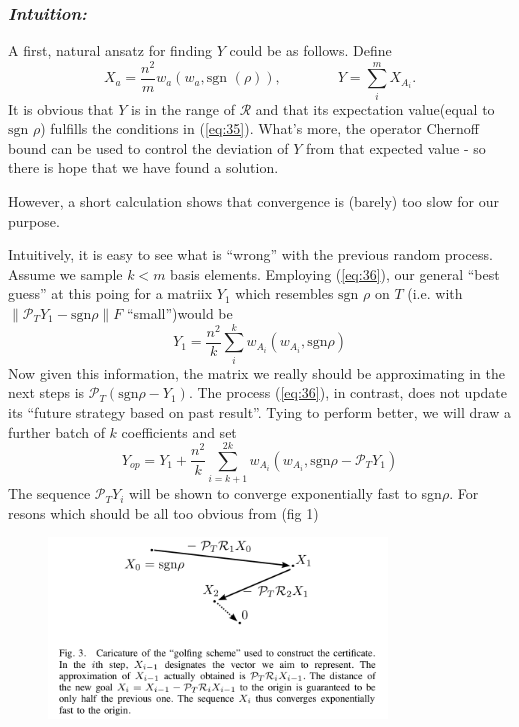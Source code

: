 \documentclass{article}
\begin{document}
\subsubsection{\textit{Intuition:}} A first, natural ansatz for finding $Y$ could be as follows. Define
\begin{equation}
X_a = \dfrac{n^2}{m}w_a(w_a,\text{sgn }(\rho)), \qquad \qquad Y = \sum_i^m X_{A_i}.
\label{eq:36}
\end{equation}
It is obvious that $Y$ is in the range of $\mathcal{R}$ and that its expectation value(equal to $\text{sgn } \rho$) fulfills the conditions in (\ref{eq:35}). What's more, the operator Chernoff bound can be used to control the deviation of $Y$ from that expected value - so there is hope that we have found a solution. 

However, a short calculation shows that convergence is (barely) too slow for our purpose.

Intuitively, it is easy to see what is ``wrong'' with the previous random process. Assume we sample $k < m$ basis elements. Employing (\ref{eq:36}), our general ``best guess'' at this poing for a matriix $Y_1$ which resembles $\text{sgn } \rho$ on $T$ (i.e. with $\|\mathcal{P}_T Y_1 - \text{sgn}\rho\|F$ ``small'')would be
\[
Y_1 = \dfrac{n^2}{k}\sum_i^k w_{A_i}(w_{A_i}, \text{sgn}\rho)
\]
Now given this information, the matrix we really should be approximating in the next steps is $\mathcal{P}_T(\text{sgn}\rho - Y_1)$. The process (\ref{eq:36}), in contrast, does not update its ``future strategy based on past result''. Tying to perform better, we will draw a further batch of $k$ coefficients and set
\[
Y_{op} = Y_1 + \dfrac{n^2}{k}\sum_{i=k+1}^{2k} w_{A_i}(w_{A_i}, \text{sgn}\rho-\mathcal{P}_T Y_1)
\]
The sequence $\mathcal{P}_T Y_i$ will be shown to converge exponentially fast to sgn$\rho$. For resons which should be all too obvious from (fig 1)

\begin{figure}[!h]
\centering
\includegraphics[width=9cm]{3.png}
\label{fig:3}
\end{figure}
\end{document}

